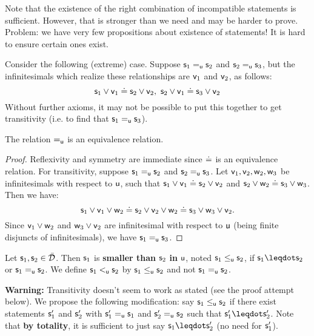 \documentclass{article}
\begin{document}
Note that the existence of the right combination of incompatible statements is sufficient. However, that is stronger than we need and may be harder to prove. Problem: we have very few propositions about existence of statements! It is hard to ensure certain ones exist. 

Consider the following (extreme) case. Suppose $\stmt_1\equ\stmt_2$ and $\stmt_2\equ\stmt_3$, but the infinitesimals which realize these relationships are $\stmt[v]_1$ and $\stmt[v]_2$, as follows:
$$
\stmt_1\OR\stmt[v]_1 \eqgran \stmt_2\OR\stmt[v]_2,\ \stmt_2\OR\stmt[v]_1\eqgran\stmt_3\OR\stmt[v]_2
$$
Without further axioms, it may not be possible to put this together to get transitivity (i.e. to find that $\stmt_1\equ\stmt_3$). 


\begin{prop}
The relation $\equ$ is an equivalence relation.
\end{prop}
\begin{proof}
Reflexivity and symmetry are immediate since $\eqgran$ is an equivalence relation. For transitivity, suppose $\stmt_1\equ\stmt_2$ and $\stmt_2\equ\stmt_3$. Let $\stmt[v]_1,\stmt[v]_2,\stmt[w]_2,\stmt[w]_3$ be infinitesimals with respect to $\stmt[u]$, such that $\stmt_1\OR\stmt[v]_1\eqgran\stmt_2\OR\stmt[v]_2$ and $\stmt_2\OR\stmt[w]_2\eqgran\stmt_3\OR\stmt[w]_3$. Then we have:
$$
\stmt_1\OR\stmt[v]_1\OR\stmt[w]_2 \eqgran \stmt_2\OR\stmt[v]_2\OR\stmt[w]_2 \eqgran \stmt_3\OR\stmt[w]_3\OR\stmt[v]_2.
$$
Since $\stmt[v]_1\OR\stmt[w]_2$ and $\stmt[w]_3\OR\stmt[v]_2$ are infinitesimal with respect to $\stmt[u]$ (being finite disjuncts of infinitesimals), we have $\stmt_1\equ\stmt_3$. 
\end{proof}

\begin{defn}\label{smalleru}
Let $\stmt_1, \stmt_2 \in \tdomain$. Then $\stmt_1$ is \textbf{smaller than} $\stmt_2$ \textbf{in} $\stmt[u]$, noted $\stmt_1 \lequ \stmt_2$, if $\stmt_1 \finer \stmt_2$ or $\stmt_1 \equ \stmt_2$. We define $\stmt_1\leu\stmt_2$ by $\stmt_1\lequ\stmt_2$ and not $\stmt_1\equ\stmt_2$. 
\end{defn}
{\bf Warning:} Transitivity doesn't seem to work as stated (see the proof attempt below). We propose the following modification: say $\stmt_1\lequ\stmt_2$ if there exist statements $\stmt_1'$ and $\stmt_2'$ with $\stmt_1'\equ\stmt_1$ and $\stmt_2'\equ\stmt_2$ such that $\stmt_1'\finer\stmt_2'$. Note that {\bf by totality}, it is sufficient to just say $\stmt_1\finer\stmt_2'$ (no need for $\stmt_1'$). 
\end{document}
